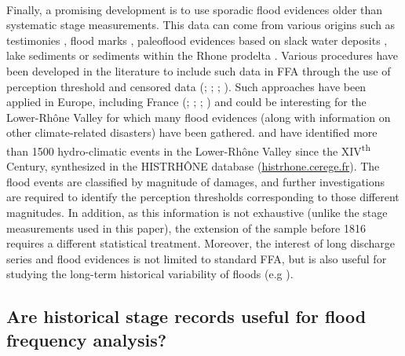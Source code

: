 \documentclass[11pt]{article}
\begin{document}
    \paragraph{}
    Finally, a promising development is to use sporadic flood evidences older than systematic stage measurements. This data can come from various origins such as testimonies \citep{pichard_sept_2014}, flood marks \citep{renard_use_2023}, paleoflood evidences based on slack water deposits \citep{sheffer_paleofloods_2003}, lake sediments \citep{wilhelm_reconstructing_2022} or sediments within the Rhone prodelta \citep{fanget_historical_2013}. Various procedures have been developed in the literature to include such data in FFA through the use of perception threshold and censored data (\cite{brazdil_historical_2006}; \cite{kjeldsen_documentary_2014}; \cite{england_guidelines_2019}; \cite{harden_historical_2021}). Such approaches have been applied in Europe, including France (\citet{naulet_flood_2005}; \citet{lang_extrapolation_2010}; \citet{neppel_flood_2010}; \citet{payrastre_usefulness_2011}) and could be interesting for the Lower-Rhône Valley for which many flood evidences (along with information on other climate-related disasters) have been gathered. \citet{pichard_sept_2014} and \citet{pichard_hydro-climatology_2017} have identified more than 1500 hydro-climatic events in the Lower-Rhône Valley since the XIV\textsuperscript{th} Century, synthesized in the HISTRHÔNE database (\url{histrhone.cerege.fr}). The flood events are classified by magnitude of damages, and further investigations are required to identify the perception thresholds corresponding to those different magnitudes. In addition, as this information is not exhaustive (unlike the stage measurements used in this paper), the extension of the sample before 1816 requires a different statistical treatment. Moreover, the interest of long discharge series and flood evidences is not limited to standard FFA, but is also useful for studying the long-term historical variability of floods (e.g \cite{macdonald_high-magnitude_2017}).
  
    \subsection{Are historical stage records useful for flood frequency analysis?}
\end{document}
